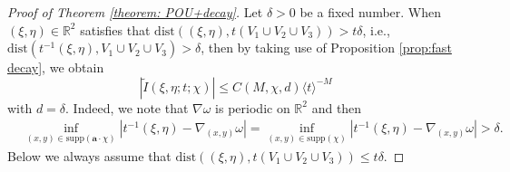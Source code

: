 \documentclass[10pt,a4paper]{amsart}
\newcommand\JP[1]{\langle#1\rangle}
\newcommand{\R}{\mathbb{R}}
\begin{document}
\begin{proof}[Proof of Theorem \ref{theorem: POU+decay}]
    Let $\delta>0$ be a fixed number. When $\left(\xi,\eta\right)\in\R^{2}$ satisfies that $\mathrm{dist}\left(\left(\xi,\eta\right),t\left(V_{1}\cup V_{2}\cup V_{3}\right)\right)>t\delta$, i.e., $\mathrm{dist}\left(t^{-1}\left(\xi,\eta\right),V_{1}\cup V_{2}\cup V_{3}\right)>\delta$, then by taking use of Proposition \ref{prop:fast decay}, we obtain
    \begin{equation*}
        \left|\widetilde{I}\left(\xi,\eta;t;\chi\right)\right|\leq C\left(M,\chi,d\right)\JP{t}^{-M}
    \end{equation*}
    with $d=\delta$. Indeed, we note that $\nabla\omega$ is periodic on $\R^{2}$ and then
    \begin{equation*}
        \begin{aligned}
            &\inf_{\left(x,y\right)\in\mathrm{supp}\left(\mathbf{a}\cdot\chi\right)}\left|t^{-1}\left(\xi,\eta\right)-\nabla_{\left(x,y\right)}\omega\right|=\inf_{\left(x,y\right)\in\mathrm{supp}\left(\chi\right)}\left|t^{-1}\left(\xi,\eta\right)-\nabla_{\left(x,y\right)}\omega\right|>\delta.
        \end{aligned}
    \end{equation*}
    Below we always assume that $\mathrm{dist}\left(\left(\xi,\eta\right),t\left(V_{1}\cup V_{2}\cup V_{3}\right)\right)\leq t\delta$. 
    

\end{proof}
\end{document}
